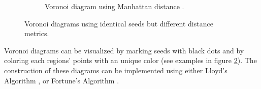 \begin{figure}[H]
\begin{subfigure}[b]{0.4\textwidth}
    \caption{Voronoi diagram using Manhattan distance \cite{voronoi_manhattan}.}
    \label{fig:voronoi_manhattan}
  \end{subfigure}
  \caption{Voronoi diagrams using identical seeds but different distance metrics.}
  \label{fig:voronoi}
\end{figure}
\vspace{-0.5cm} %

Voronoi diagrams can be visualized by marking seeds with black dots and by coloring each regions' points with an unique color (see examples in figure \ref{fig:voronoi}).
The construction of these diagrams can be implemented using either Lloyd's Algorithm \cite{voronoi_lloyd}, or Fortune's Algorithm \cite{voronoi_fortune}. 